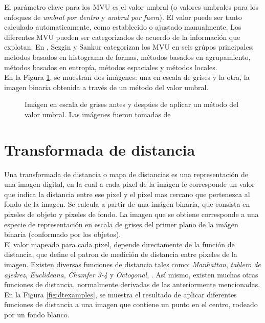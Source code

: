 El par\'ametro clave para los MVU es el valor umbral (o valores umbrales para los enfoques de
\emph{umbral por dentro} y \emph{umbral por fuera}). El valor puede ser tanto calculado
automaticamente, como establecido o ajustado manualmente. Los diferentes MVU pueden ser categorizados 
de acuerdo de la informaci\'on que explotan. En \cite[p.147]{thres}, Sezgin y Sankur
categorizan los MVU en seis gr\'upos principales: m\'etodos basados en histograma de formas,  
m\'etodos basados en agrupamiento, m\'etodos basados en entrop\'ia, m\'etodos espaciales y
m\'etodos locales.\\

En la Figura \ref{fig:thres1}, se muestran dos im\'agenes: una en escala de grises y la 
otra, la imagen binaria obtenida a trav\'es de un m\'etodo del valor umbral.

\begin{figure}[h t b p ! H]
  \centering
\qquad
  \caption[Im\'agen en escala de grises antes y desp\'ues de aplicar un m\'etodo del valor umbral ]{Im\'agen en escala de grises antes y desp\'ues de 
    aplicar un m\'etodo del valor umbral. Las im\'agenes fueron tomadas de \cite{web:thresholding}}
  \label{fig:thres1}
\end{figure}

\section{Transformada de distancia}
\label{sec:dt}

Una transformada de distancia o mapa de distancias es una representaci\'on de
una imagen digital, en la cual a cada pixel de la im\'agen le corresponde
un valor que indica la distancia entre ese pixel y el pixel mas cercano que pertenezca
al fondo de la imagen. Se calcula a partir de una im\'agen binaria, que consista
en pixeles de objeto y pixeles de fondo. La imagen que se obtiene corresponde a
una especie de representaci\'on en escala de grises del primer plano de la im\'agen
binaria (conformado por los objetos).\\
El valor mapeado para cada pixel, depende directamente de la funci\'on de distancia,
que define el patron de medici\'on de distancia entre pixeles de la imagen. Existen
diversas funciones de distancia tales como: \emph{Manhattan},
\emph{tablero de ajedrez}, \emph{Euclideana}, \emph{Chamfer 3-4} y \emph{Octogonal}, 
\cite[p.363]{dtresearch}. As\'i mismo, existen muchas otras funciones de
distancia, normalmente derivadas de las anteriormente mencionadas.
En la Figura \ref{fig:dtexamples}, se muestra el resultado de aplicar 
diferentes funciones de distancia a una imagen que contiene un punto en el centro,
rodeado por un fondo blanco.

